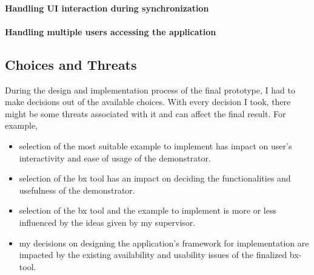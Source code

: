 \paragraph{Handling UI interaction during synchronization}


\paragraph{Handling multiple users accessing the application}


\subsection{Choices and Threats}\label{subsec:design_choicesthreats}
During the design and implementation process of the final prototype, I had to make decisions out of the available choices. With every decision I took, there might be some threats associated with it and can affect the final result. For example, 
\begin{itemize} 
	\item {selection of the most suitable example to implement has impact on user's interactivity and ease of usage of the demonstrator.}
	\item {selection of the bx tool has an impact on deciding the functionalities and usefulness of the demonstrator.}
	\item {selection of the bx tool and the example to implement is more or less influenced by the ideas given by my supervisor.} 
	\item {my decisions on designing the application's framework for implementation are impacted by the existing availability and usability issues of the finalized bx-tool.}
\end{itemize}
